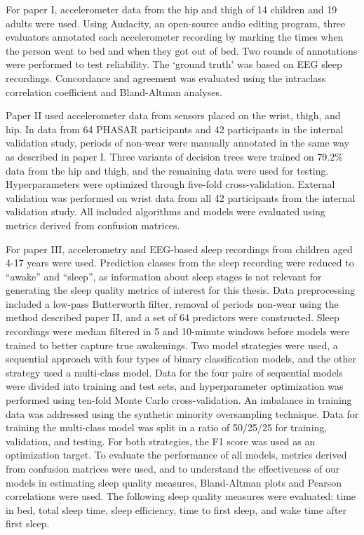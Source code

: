 \documentclass[
  10pt,
]{scrbook}
\begin{document}
For paper I, accelerometer data from the hip and thigh of 14 children
and 19 adults were used. Using Audacity, an open-source audio editing
program, three evaluators annotated each accelerometer recording by
marking the times when the person went to bed and when they got out of
bed. Two rounds of annotations were performed to test reliability. The
`ground truth' was based on EEG sleep recordings. Concordance and
agreement was evaluated using the intraclass correlation coefficient and
Bland-Altman analyses.

Paper II used accelerometer data from sensors placed on the wrist,
thigh, and hip. In data from 64 PHASAR participants and 42 participants
in the internal validation study, periods of non-wear were manually
annotated in the same way as described in paper I. Three variants of
decision trees were trained on 79.2\% data from the hip and thigh, and
the remaining data were used for testing. Hyperparameters were optimized
through five-fold cross-validation. External validation was performed on
wrist data from all 42 participants from the internal validation study.
All included algorithms and models were evaluated using metrics derived
from confusion matrices.

For paper III, accelerometry and EEG-based sleep recordings from
children aged 4-17 years were used. Prediction classes from the sleep
recording were reduced to ``awake'' and ``sleep'', as information about
sleep stages is not relevant for generating the sleep quality metrics of
interest for this thesis. Data preprocessing included a low-pass
Butterworth filter, removal of periods non-wear using the method
described paper II, and a set of 64 predictors were constructed. Sleep
recordings were median filtered in 5 and 10-minute windows before models
were trained to better capture true awakenings. Two model strategies
were used, a sequential approach with four types of binary
classification models, and the other strategy used a multi-class model.
Data for the four pairs of sequential models were divided into training
and test sets, and hyperparameter optimization was performed using
ten-fold Monte Carlo cross-validation. An imbalance in training data was
addressed using the synthetic minority oversampling technique. Data for
training the multi-class model was split in a ratio of 50/25/25 for
training, validation, and testing. For both strategies, the F1 score was
used as an optimization target. To evaluate the performance of all
models, metrics derived from confusion matrices were used, and to
understand the effectiveness of our models in estimating sleep quality
measures, Bland-Altman plots and Pearson correlations were used. The
following sleep quality measures were evaluated: time in bed, total
sleep time, sleep efficiency, time to first sleep, and wake time after
first sleep.
\end{document}

